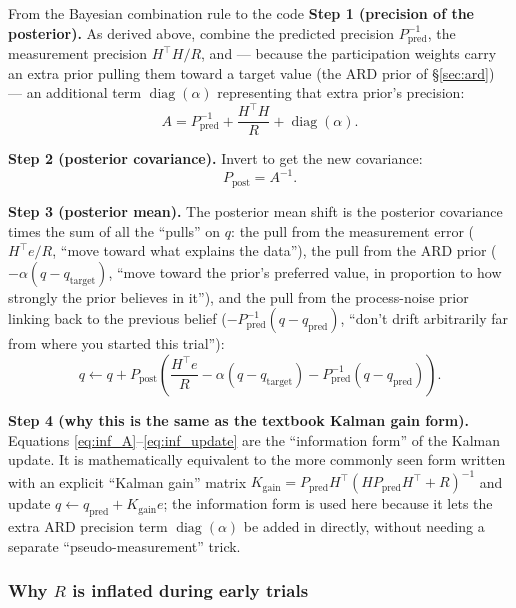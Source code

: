\documentclass[11pt,a4paper]{article}
\DeclareMathOperator{\diag}{diag}
\begin{document}
\begin{stepbox}{From the Bayesian combination rule to the code}
\textbf{Step 1 (precision of the posterior).} As derived above, combine the
predicted precision $P_{\mathrm{pred}}^{-1}$, the measurement precision
$H^\top H/R$, and --- because the participation weights carry an extra prior
pulling them toward a target value (the ARD prior of \S\ref{sec:ard}) --- an
additional term $\diag(\alpha)$ representing that extra prior's precision:
\begin{equation}
A = P_{\mathrm{pred}}^{-1} + \frac{H^\top H}{R} + \diag(\alpha).
\label{eq:inf_A}
\end{equation}

\textbf{Step 2 (posterior covariance).} Invert to get the new covariance:
\begin{equation}
P_{\mathrm{post}} = A^{-1}.
\label{eq:inf_post}
\end{equation}

\textbf{Step 3 (posterior mean).} The posterior mean shift is the posterior
covariance times the sum of all the ``pulls'' on $q$: the pull from the
measurement error ($H^\top e/R$, ``move toward what explains the data''), the
pull from the ARD prior ($-\alpha(q-q_{\mathrm{target}})$, ``move toward the
prior's preferred value, in proportion to how strongly the prior believes in
it''), and the pull from the process-noise prior linking back to the previous
belief ($-P_{\mathrm{pred}}^{-1}(q-q_{\mathrm{pred}})$, ``don't drift
arbitrarily far from where you started this trial''):
\begin{equation}
q \leftarrow q + P_{\mathrm{post}}\left(\frac{H^\top e}{R}
  - \alpha(q-q_{\mathrm{target}})
  - P_{\mathrm{pred}}^{-1}(q-q_{\mathrm{pred}})\right).
\label{eq:inf_update}
\end{equation}

\textbf{Step 4 (why this is the same as the textbook Kalman gain form).}
Equations \eqref{eq:inf_A}--\eqref{eq:inf_update} are the ``information
form'' of the Kalman update. It is mathematically equivalent to the more
commonly seen form written with an explicit ``Kalman gain'' matrix $K_{\mathrm{gain}}
=P_{\mathrm{pred}}H^\top(HP_{\mathrm{pred}}H^\top+R)^{-1}$ and update $q
\leftarrow q_{\mathrm{pred}}+K_{\mathrm{gain}}e$; the information form is used
here because it lets the extra ARD precision term $\diag(\alpha)$ be added in
directly, without needing a separate ``pseudo-measurement'' trick.
\end{stepbox}

\subsubsection{Why $R$ is inflated during early trials}
\end{document}
